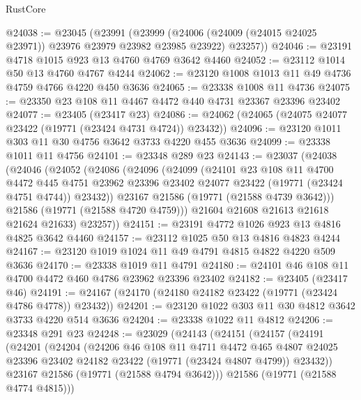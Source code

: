 \begin{lexlean}{RustCore}
\begin{coremodule}
@24038 := @23045
    (@23991
      (@23999 (@24006 (@24009 (@24015 @24025 @23971)) @23976 @23979 @23982 @23985 @23922) @23257))
@24046 := @23191 @4718 @1015 @923 @13 @4760 @4769 @3642 @4460
@24052 := @23112 @1014 @50 @13 @4760 @4767 @4244
@24062 := @23120 @1008 @1013 @11 @49 @4736 @4759 @4766 @4220 @450 @3636
@24065 := @23338 @1008 @11 @4736
@24075 := @23350 @23 @108 @11 @4467 @4472 @440 @4731 @23367 @23396 @23402
@24077 := @23405 (@23417 @23)
@24086 := @24062 (@24065 (@24075 @24077 @23422 (@19771 (@23424 @4731 @4724)) @23432))
@24096 := @23120 @1011 @303 @11 @30 @4756 @3642 @3733 @4220 @455 @3636
@24099 := @23338 @1011 @11 @4756
@24101 := @23348 @289 @23
@24143 := @23037
    (@24038
      (@24046
        (@24052
          (@24086
            (@24096
              (@24099
                (@24101
                  @23
                  @108
                  @11
                  @4700
                  @4472
                  @445
                  @4751
                  @23962
                  @23396
                  @23402
                  @24077
                  @23422
                  (@19771 (@23424 @4751 @4744))
                  @23432))
              @23167
              @21586
              (@19771 (@21588 @4739 @3642)))
            @21586
            (@19771 (@21588 @4720 @4759)))
          @21604
          @21608
          @21613
          @21618
          @21624
          @21633)
        @23257))
@24151 := @23191 @4772 @1026 @923 @13 @4816 @4825 @3642 @4460
@24157 := @23112 @1025 @50 @13 @4816 @4823 @4244
@24167 := @23120 @1019 @1024 @11 @49 @4791 @4815 @4822 @4220 @509 @3636
@24170 := @23338 @1019 @11 @4791
@24180 := @24101 @46 @108 @11 @4700 @4472 @460 @4786 @23962 @23396 @23402
@24182 := @23405 (@23417 @46)
@24191 := @24167 (@24170 (@24180 @24182 @23422 (@19771 (@23424 @4786 @4778)) @23432))
@24201 := @23120 @1022 @303 @11 @30 @4812 @3642 @3733 @4220 @514 @3636
@24204 := @23338 @1022 @11 @4812
@24206 := @23348 @291 @23
@24248 := @23029
    (@24143
      (@24151
        (@24157
          (@24191
            (@24201
              (@24204
                (@24206
                  @46
                  @108
                  @11
                  @4711
                  @4472
                  @465
                  @4807
                  @24025
                  @23396
                  @23402
                  @24182
                  @23422
                  (@19771 (@23424 @4807 @4799))
                  @23432))
              @23167
              @21586
              (@19771 (@21588 @4794 @3642)))
            @21586
            (@19771 (@21588 @4774 @4815)))

\end{coremodule}
\end{lexlean}
